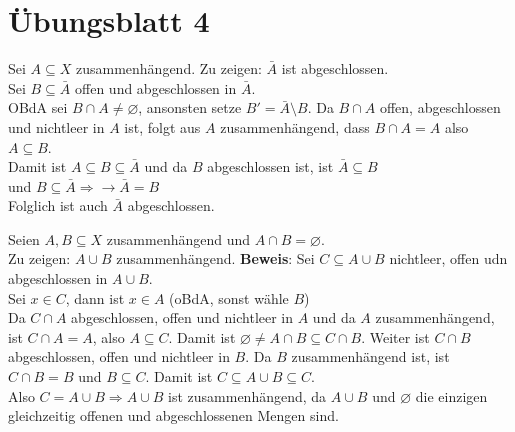 % 
\section{Übungsblatt 4}

\begin{problem*}[1]
  Sei \( A \subseteq X \) zusammenhängend. Zu zeigen: \( \bar{A} \) ist abgeschlossen. \\ 
  Sei \( B \subseteq \bar{A} \) offen und abgeschlossen in \( \bar{A} \). \\
  OBdA sei \( B \cap A \neq \varnothing \), ansonsten setze \( B' = \bar{A} \setminus B \).
  Da \( B \cap A \) offen, abgeschlossen und nichtleer in \( A \) ist, folgt aus \( A \) zusammenhängend, dass 
  \( B \cap A = A \) also \( A \subseteq B \). \\
  Damit ist \( A \subseteq B \subseteq \bar{A} \) und da \( B \) abgeschlossen ist, ist \( \bar{A} \subseteq B \) \\
  und \( B \subseteq \bar{A} \Rightarrow \rightarrow \bar{A} = B \) \\
  Folglich ist auch \( \bar{A} \) abgeschlossen.
\end{problem*}

\begin{problem*}[1b]
  Seien \( A,B \subseteq X \) zusammenhängend und \( A \cap B = \varnothing \). \\
  Zu zeigen: \( A \cup B \) zusammenhängend.
  \textbf{Beweis}: Sei \( C \subseteq A \cup B \) nichtleer, offen udn abgeschlossen in \( A \cup B \). \\
  Sei \( x \in C \), dann ist \( x \in A \) (oBdA, sonst wähle \( B \))\\
  Da \( C \cap A \) abgeschlossen, offen und nichtleer in \( A \) und da \( A \) zusammenhängend, ist \( C \cap A = A \), also \( A \subseteq C \). Damit ist \( \varnothing \neq A \cap B \subseteq C \cap B \). Weiter ist \( C \cap B \) abgeschlossen, offen und nichtleer in \( B \). Da \( B \) zusammenhängend ist, ist \( C \cap B = B \) und \( B \subseteq C \). Damit ist \( C \subseteq A \cup B \subseteq C \). \\
  Also \( C = A \cup B \Rightarrow A \cup B \) ist zusammenhängend, da \( A \cup B \) und \( \varnothing \) die einzigen gleichzeitig offenen und abgeschlossenen Mengen sind. 
  
\end{problem*}

